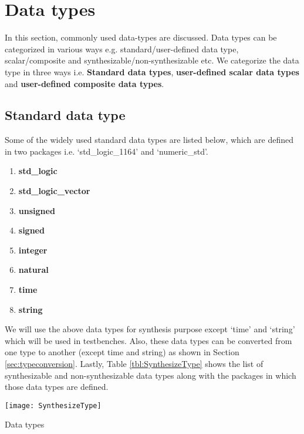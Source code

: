 \section{Data types}
In this section, commonly used data-types are discussed. Data types can be categorized in various ways e.g. standard/user-defined data type, scalar/composite and synthesizable/non-synthesizable etc. We categorize the data type in three ways i.e. \textbf{Standard data types}, \textbf{user-defined scalar data types} and \textbf{user-defined composite data types}. 

\subsection{Standard data type}
Some of the widely used standard data types are listed below,  which are defined in two packages i.e. `std\_logic\_1164' and `numeric\_std'.  

\begin{multicols}{4}
	\begin{enumerate}
		\item \textbf{std\_logic}
		\item \textbf{std\_logic\_vector}
		\item \textbf{unsigned}
		\item \textbf{signed}
		\item \textbf{integer}
		\item \textbf{natural}
		\item \textbf{time}
		\item \textbf{string}
	\end{enumerate}
\end{multicols}

We will use the above data types for synthesis purpose except `time' and `string' which will be used in testbenches. Also, these data types can be converted from one type to another (except time and string) as shown in Section \ref{sec:typeconversion}. Lastly, Table \ref{tbl:SynthesizeType} shows the list of synthesizable and non-synthesizable data types along with the packages in which those data types are defined.

\begin{table}
	\centering
	\texttt{[image: SynthesizeType]}
	\caption{Data types}
	\label{tbl:SynthesizeType}
\end{table}


